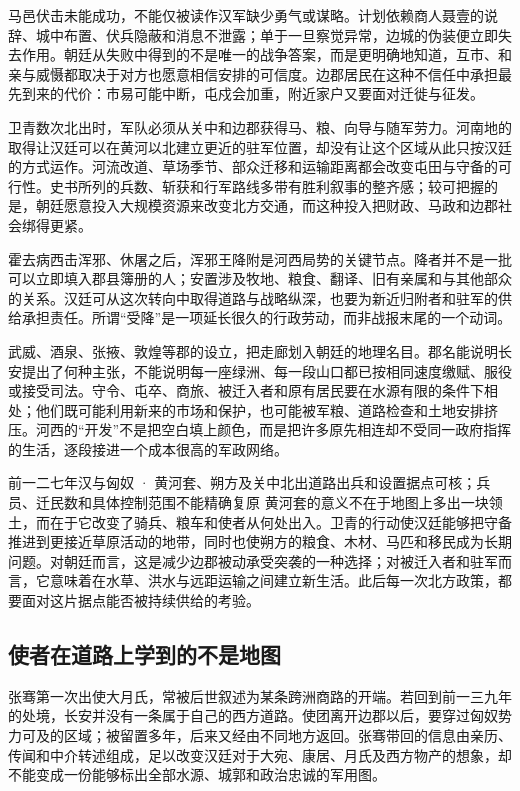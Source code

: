 马邑伏击未能成功，不能仅被读作汉军缺少勇气或谋略。计划依赖商人聂壹的说辞、城中布置、伏兵隐蔽和消息不泄露；单于一旦察觉异常，边城的伪装便立即失去作用。朝廷从失败中得到的不是唯一的战争答案，而是更明确地知道，互市、和亲与威慑都取决于对方也愿意相信安排的可信度。边郡居民在这种不信任中承担最先到来的代价：市易可能中断，屯戍会加重，附近家户又要面对迁徙与征发。

卫青数次北出时，军队必须从关中和边郡获得马、粮、向导与随军劳力。河南地的取得让汉廷可以在黄河以北建立更近的驻军位置，却没有让这个区域从此只按汉廷的方式运作。河流改道、草场季节、部众迁移和运输距离都会改变屯田与守备的可行性。史书所列的兵数、斩获和行军路线多带有胜利叙事的整齐感；较可把握的是，朝廷愿意投入大规模资源来改变北方交通，而这种投入把财政、马政和边郡社会绑得更紧。

霍去病西击浑邪、休屠之后，浑邪王降附是河西局势的关键节点。降者并不是一批可以立即填入郡县簿册的人；安置涉及牧地、粮食、翻译、旧有亲属和与其他部众的关系。汉廷可从这次转向中取得道路与战略纵深，也要为新近归附者和驻军的供给承担责任。所谓“受降”是一项延长很久的行政劳动，而非战报末尾的一个动词。

武威、酒泉、张掖、敦煌等郡的设立，把走廊划入朝廷的地理名目。郡名能说明长安提出了何种主张，不能说明每一座绿洲、每一段山口都已按相同速度缴赋、服役或接受司法。守令、屯卒、商旅、被迁入者和原有居民要在水源有限的条件下相处；他们既可能利用新来的市场和保护，也可能被军粮、道路检查和土地安排挤压。河西的“开发”不是把空白填上颜色，而是把许多原先相连却不受同一政府指挥的生活，逐段接进一个成本很高的军政网络。

\begin{event}{}{前一二七年}{汉与匈奴 · 黄河套、朔方及关中北出道路}{出兵和设置据点可核；兵员、迁民数和具体控制范围不能精确复原}
黄河套的意义不在于地图上多出一块领土，而在于它改变了骑兵、粮车和使者从何处出入。卫青的行动使汉廷能够把守备推进到更接近草原活动的地带，同时也使朔方的粮食、木材、马匹和移民成为长期问题。对朝廷而言，这是减少边郡被动承受突袭的一种选择；对被迁入者和驻军而言，它意味着在水草、洪水与远距运输之间建立新生活。此后每一次北方政策，都要面对这片据点能否被持续供给的考验。
\end{event}

\subsection{使者在道路上学到的不是地图}

张骞第一次出使大月氏，常被后世叙述为某条跨洲商路的开端。若回到前一三九年的处境，长安并没有一条属于自己的西方道路。使团离开边郡以后，要穿过匈奴势力可及的区域；被留置多年，后来又经由不同地方返回。张骞带回的信息由亲历、传闻和中介转述组成，足以改变汉廷对于大宛、康居、月氏及西方物产的想象，却不能变成一份能够标出全部水源、城郭和政治忠诚的军用图。

